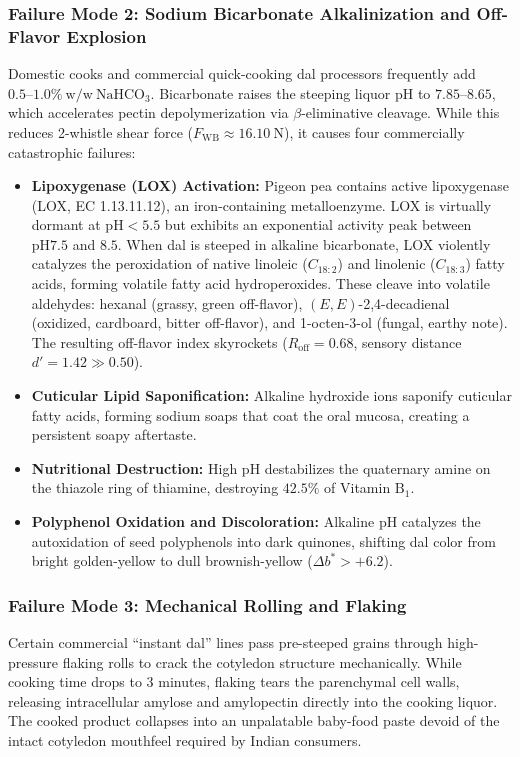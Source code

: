 \documentclass[10pt,a4paper]{article}
\begin{document}
\subsubsection{Failure Mode 2: Sodium Bicarbonate Alkalinization and Off-Flavor Explosion}
Domestic cooks and commercial quick-cooking dal processors frequently add $0.5\text{--}1.0\%\ \mathrm{w/w}\ \mathrm{NaHCO}_3$. Bicarbonate raises the steeping liquor pH to $7.85\text{--}8.65$, which accelerates pectin depolymerization via $\beta$-eliminative cleavage. While this reduces 2-whistle shear force ($F_{\mathrm{WB}} \approx 16.10\ \mathrm{N}$), it causes four commercially catastrophic failures:
\begin{itemize}[leftmargin=1.5em]
    \item \textbf{Lipoxygenase (LOX) Activation:} Pigeon pea contains active lipoxygenase (LOX, EC 1.13.11.12), an iron-containing metalloenzyme. LOX is virtually dormant at $\mathrm{pH } < 5.5$ but exhibits an exponential activity peak between $\mathrm{pH } 7.5$ and $8.5$. When dal is steeped in alkaline bicarbonate, LOX violently catalyzes the peroxidation of native linoleic ($C_{18:2}$) and linolenic ($C_{18:3}$) fatty acids, forming volatile fatty acid hydroperoxides. These cleave into volatile aldehydes: hexanal (grassy, green off-flavor), $(E,E)$-2,4-decadienal (oxidized, cardboard, bitter off-flavor), and 1-octen-3-ol (fungal, earthy note). The resulting off-flavor index skyrockets ($R_{\mathrm{off}} = 0.68$, sensory distance $d' = 1.42 \gg 0.50$).
    \item \textbf{Cuticular Lipid Saponification:} Alkaline hydroxide ions saponify cuticular fatty acids, forming sodium soaps that coat the oral mucosa, creating a persistent soapy aftertaste.
    \item \textbf{Nutritional Destruction:} High pH destabilizes the quaternary amine on the thiazole ring of thiamine, destroying $42.5\%$ of Vitamin $\mathrm{B}_1$.
    \item \textbf{Polyphenol Oxidation and Discoloration:} Alkaline pH catalyzes the autoxidation of seed polyphenols into dark quinones, shifting dal color from bright golden-yellow to dull brownish-yellow ($\Delta b^* > +6.2$).
\end{itemize}

\subsubsection{Failure Mode 3: Mechanical Rolling and Flaking}
Certain commercial ``instant dal'' lines pass pre-steeped grains through high-pressure flaking rolls to crack the cotyledon structure mechanically. While cooking time drops to 3 minutes, flaking tears the parenchymal cell walls, releasing intracellular amylose and amylopectin directly into the cooking liquor. The cooked product collapses into an unpalatable baby-food paste devoid of the intact cotyledon mouthfeel required by Indian consumers.
\end{document}
